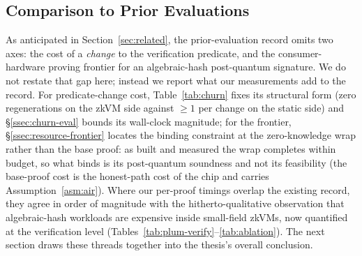 \subsection{Comparison to Prior Evaluations}\label{ssec:prior-eval}
As anticipated in Section~\ref{sec:related}, the prior-evaluation record omits two axes: the cost of a \emph{change} to the verification predicate, and the consumer-hardware proving frontier for an algebraic-hash post-quantum signature. We do not restate that gap here; instead we report what our measurements add to the record. For predicate-change cost, Table~\ref{tab:churn} fixes its structural form (zero regenerations on the zkVM side against $\geq 1$ per change on the static side) and \S\ref{ssec:churn-eval} bounds its wall-clock magnitude; for the frontier, \S\ref{ssec:resource-frontier} locates the binding constraint at the zero-knowledge wrap rather than the base proof: as built and measured the wrap completes within budget, so what binds is its post-quantum soundness and not its feasibility (the base-proof cost is the honest-path cost of the chip and carries Assumption~\ref{asm:air}). Where our per-proof timings overlap the existing record, they agree in order of magnitude with the hitherto-qualitative observation that algebraic-hash workloads are expensive inside small-field zkVMs, now quantified at the verification level (Tables~\ref{tab:plum-verify}--\ref{tab:ablation}). The next section draws these threads together into the thesis's overall conclusion.
